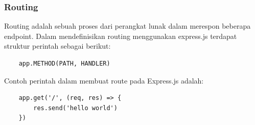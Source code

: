 \subsubsection{Routing}
Routing adalah sebuah proses dari perangkat lunak dalam merespon beberapa endpoint. Dalam mendefinisikan routing menggunakan express.js terdapat struktur perintah sebagai berikut:
\begin{verbatim}
	app.METHOD(PATH, HANDLER)
\end{verbatim} 
Contoh perintah dalam membuat route pada Express.js adalah:
\begin{lstlisting}
	app.get('/', (req, res) => {
		res.send('hello world')
	})
\end{lstlisting}